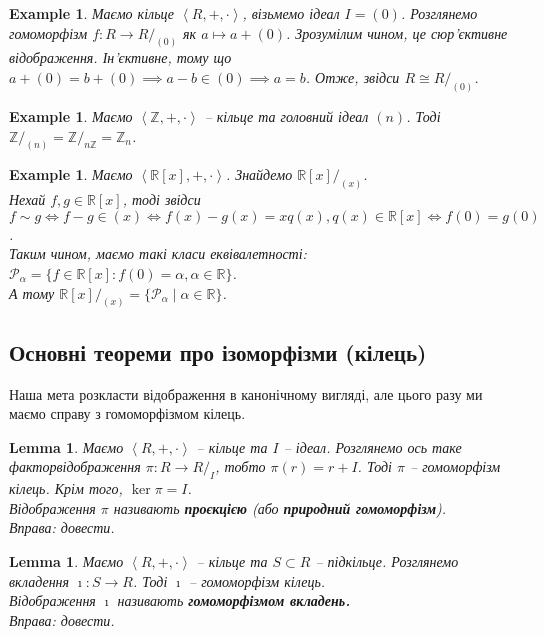 \documentclass[a4paper, 10pt]{article}
\theoremstyle{theoremdd}
\theoremstyle{theoremdd}
\theoremstyle{theoremdd}
\theoremstyle{theoremdd}
\theoremstyle{theoremdd}
\newtheorem{example}[theorem]{Example}
\theoremstyle{theoremdd}
\theoremstyle{theoremdd}
\theoremstyle{theoremdd}
\theoremstyle{theoremdd}
\theoremstyle{theoremdd}
\theoremstyle{theoremdd}
\theoremstyle{theoremdd}
\theoremstyle{theoremdd}
\newtheorem{lemma}[theorem]{Lemma}
\theoremstyle{theoremdd}
\theoremstyle{theoremdd}
\begin{document}
\begin{example}
Маємо кільце $\left<R,+,\cdot \right>$, візьмемо ідеал $I = (0)$. Розглянемо гомоморфізм $f \colon R \to R/_{(0)}$ як $a \mapsto a + (0)$. Зрозумілим чином, це сюр'єктивне відображення. Ін'єктивне, тому що $a + (0) = b + (0) \implies a - b \in (0) \implies a = b$. Отже, звідси $R \cong R/_{(0)}$.
\end{example}

\begin{example}
Маємо $\left< \mathbb{Z},+,\cdot \right>$ -- кільце та головний ідеал $(n)$. Тоді $\mathbb{Z}/_{(n)} = \mathbb{Z}/_{n\mathbb{Z}} = \mathbb{Z}_n$.
\end{example}

\begin{example}
Маємо $\left< \mathbb{R}[x],+,\cdot \right>$. Знайдемо $\mathbb{R}[x]/_{(x)}$.\\
Нехай $f,g \in \mathbb{R}[x]$, тоді звідси\\
$f \sim g \iff f - g \in (x) \iff f(x)-g(x) = x q(x), q(x) \in \mathbb{R}[x] \iff f(0) = g(0)$.\\
Таким чином, маємо такі класи еквівалетності:\\
$\mathcal{P}_\alpha = \{f \in \mathbb{R}[x]: f(0) = \alpha, \alpha \in \mathbb{R} \}$.\\
А тому $\mathbb{R}[x]/_{(x)} = \{ \mathcal{P}_\alpha \mid \alpha \in \mathbb{R} \}$.
\end{example}

\subsection{Основні теореми про ізоморфізми (кілець)}
Наша мета розкласти відображення в канонічному вигляді, але цього разу ми маємо справу з гомоморфізмом кілець.
\begin{lemma}
Маємо $\left< R, + ,\cdot \right>$ -- кільце та $I$ -- ідеал. Розглянемо ось таке факторвідображення $\pi \colon R \to R/_{I}$, тобто $\pi(r) = r + I$. Тоді $\pi$ -- гомоморфізм кілець. Крім того, $\ker \pi = I$.\\
Відображення $\pi$ називають \textbf{проєкцією} (або \textbf{природний гомоморфізм}).\\
\textit{Вправа: довести.}
\end{lemma}

\begin{lemma}
Маємо $\left<R, +, \cdot \right>$ -- кільце та $S \subset R$ -- підкільце. Розглянемо вкладення $\imath \colon S \to R$. Тоді $\imath$ -- гомоморфізм кілець.\\
Відображення $\imath$ називають \textbf{гомоморфізмом вкладень.}\\
\textit{Вправа: довести.}
\end{lemma}
\end{document}
